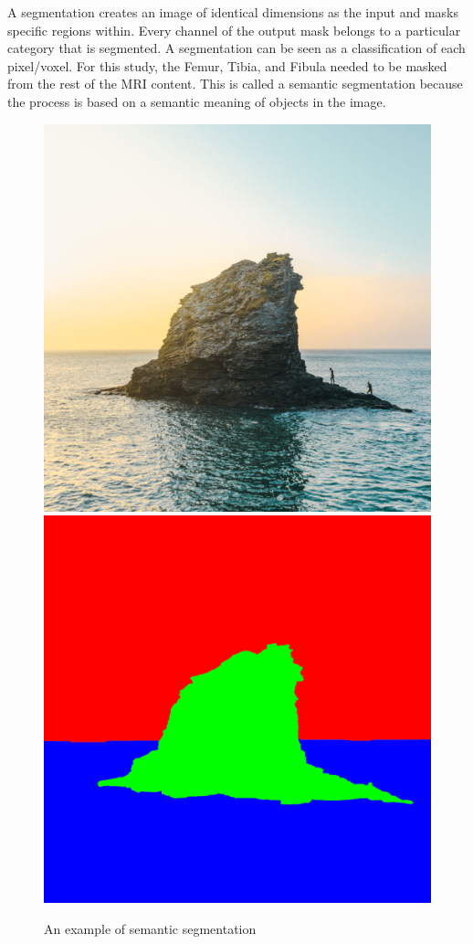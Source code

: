 A segmentation creates an image of identical dimensions as the input and masks specific regions within. Every channel of the output mask belongs to a particular category that is segmented. A segmentation can be seen as a classification of each pixel/voxel. For this study, the Femur, Tibia, and Fibula needed to be masked from the rest of the MRI content. This is called a semantic segmentation because the process is based on a semantic meaning of objects in the image.

\begin{figure}[H]
  \centering
{}
  \includegraphics[width=\linewidth]{imgs/landscape.jpg}
\endminipage \hspace{0.2cm}
%
  \includegraphics[width=\linewidth]{imgs/landscape_mask.jpg}
\endminipage
\caption{An example of semantic segmentation}
\end{figure}

\newpage